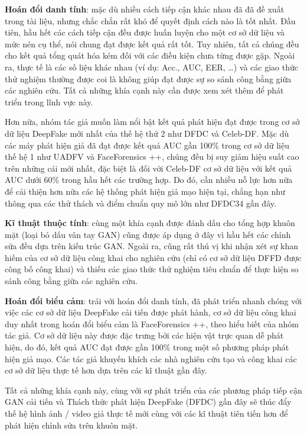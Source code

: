 \documentclass{article}
\begin{document}
\textbf{Hoán đổi danh tính}: mặc dù nhiều cách tiếp cận khác nhau đã đã đề xuất trong tài liệu, nhưng chắc chắn rất khó để quyết định cách nào là tốt nhất. Đầu tiên, hầu hết các cách tiếp cận đều được huấn luyện cho một cơ sở dữ liệu và mức nén cụ thể, nói chung đạt được kết quả rất tốt. Tuy nhiên, tất cả chúng đều cho kết quả tổng quát hóa kém đối với các điều kiện chưa từng được gặp. Ngoài ra, thực tế là các số liệu khác nhau (ví dụ: Acc., AUC, EER, …) và các giao thức thử nghiệm thường được coi là không giúp đạt được sự so sánh công bằng giữa các nghiên cứu. Tất cả những khía cạnh này cần được xem xét thêm để phát triển trong lĩnh vực này.

Hơn nữa, nhóm tác giả muốn làm nổi bật kết quả phát hiện đạt được trong cơ sở dữ liệu DeepFake mới nhất của thế hệ thứ 2 như DFDC và Celeb-DF. Mặc dù các máy phát hiện giả đã đạt được kết quả AUC gần 100\% trong cơ sở dữ liệu thế hệ 1 như UADFV và FaceForensics ++, chúng đều bị suy giảm hiệu suất cao trên những cái mới nhất, đặc biệt là đối với Celeb-DF cơ sở dữ liệu với kết quả AUC dưới 60\% trong hầu hết các trường hợp. Do đó, cần nhiều nỗ lực hơn nữa để cải thiện hơn nữa các hệ thống phát hiện giả mạo hiện tại, chẳng hạn như thông qua các thử thách và điểm chuẩn quy mô lớn như DFDC34 gần đây.

\textbf{Kĩ thuật thuộc tính}: cùng một khía cạnh được đánh dấu cho tổng hợp khuôn mặt (loại bỏ dấu vân tay GAN) cũng được áp dụng ở đây vì hầu hết các chỉnh sửa đều dựa trên kiến trúc GAN. Ngoài ra, cũng rất thú vị khi nhận xét sự khan hiếm của cơ sở dữ liệu công khai cho nghiên cứu (chỉ có cơ sở dữ liệu DFFD được công bố công khai) và thiếu các giao thức thử nghiệm tiêu chuẩn để thực hiện so sánh công bằng giữa các nghiên cứu.

\textbf{Hoán đổi biểu cảm}: trái với hoán đổi danh tính, đã phát triển nhanh chóng với việc các cơ sở dữ liệu DeepFake cải tiến được phát hành, cơ sở dữ liệu công khai duy nhất trong hoán đổi biểu cảm là FaceForensics ++, theo hiểu biết của nhóm tác giả. Cơ sở dữ liệu này được đặc trưng bởi các hiện vật trực quan dễ phát hiện, do đó, kết quả AUC đạt được gần 100\% trong một số phương pháp phát hiện giả mạo. Các tác giả khuyến khích các nhà nghiên cứu tạo và công khai các cơ sở dữ liệu thực tế hơn dựa trên các kĩ thuật gần đây.

Tất cả những khía cạnh này, cùng với sự phát triển của các phương pháp tiếp cận GAN cải tiến và Thách thức phát hiện DeepFake (DFDC) gần đây sẽ thúc đẩy thế hệ hình ảnh / video giả thực tế mới cùng với các kĩ thuật tiên tiến hơn để phát hiện chỉnh sửa trên khuôn mặt.





\end{document}
